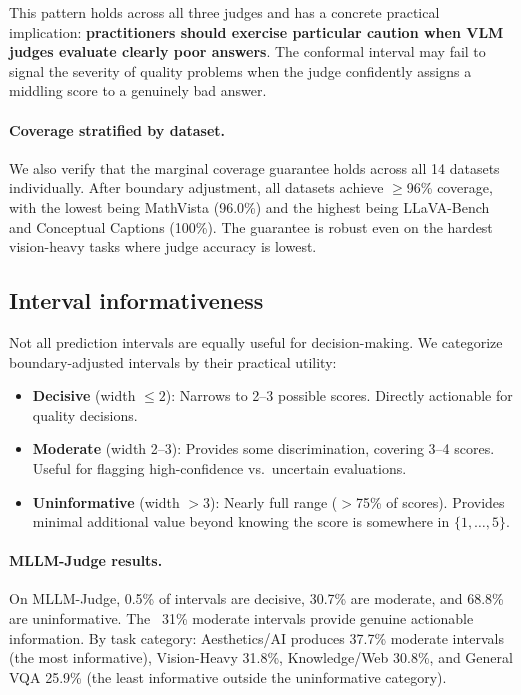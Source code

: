 \documentclass{article}
\begin{document}
This pattern holds across all three judges and has a concrete practical implication: \textbf{practitioners should exercise particular caution when VLM judges evaluate clearly poor answers}. The conformal interval may fail to signal the severity of quality problems when the judge confidently assigns a middling score to a genuinely bad answer.

\paragraph{Coverage stratified by dataset.} We also verify that the marginal coverage guarantee holds across all 14 datasets individually. After boundary adjustment, all datasets achieve $\geq$96\% coverage, with the lowest being MathVista (96.0\%) and the highest being LLaVA-Bench and Conceptual Captions (100\%). The guarantee is robust even on the hardest vision-heavy tasks where judge accuracy is lowest.

\subsection{Interval informativeness}
\label{sec:informativeness}

Not all prediction intervals are equally useful for decision-making. We categorize boundary-adjusted intervals by their practical utility:

\begin{itemize}[leftmargin=*,itemsep=1pt,topsep=2pt]
\item \textbf{Decisive} (width $\leq 2$): Narrows to 2--3 possible scores. Directly actionable for quality decisions.
\item \textbf{Moderate} (width 2--3): Provides some discrimination, covering 3--4 scores. Useful for flagging high-confidence vs.\ uncertain evaluations.
\item \textbf{Uninformative} (width $> 3$): Nearly full range ($>$75\% of scores). Provides minimal additional value beyond knowing the score is somewhere in $\{1, \ldots, 5\}$.
\end{itemize}

\paragraph{MLLM-Judge results.} On MLLM-Judge, 0.5\% of intervals are decisive, 30.7\% are moderate, and 68.8\% are uninformative. The ~31\% moderate intervals provide genuine actionable information. By task category: Aesthetics/AI produces 37.7\% moderate intervals (the most informative), Vision-Heavy 31.8\%, Knowledge/Web 30.8\%, and General VQA 25.9\% (the least informative outside the uninformative category).
\end{document}
